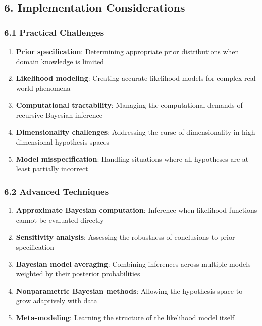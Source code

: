 \documentclass[
]{article}
\providecommand{\tightlist}{%
  \setlength{\itemsep}{0pt}\setlength{\parskip}{0pt}}
\begin{document}
\subsection{6. Implementation
Considerations}\label{implementation-considerations-1}

\subsubsection{6.1 Practical Challenges}\label{practical-challenges-1}

\begin{enumerate}
\def\labelenumi{\arabic{enumi}.}
\tightlist
\item
  \textbf{Prior specification}: Determining appropriate prior
  distributions when domain knowledge is limited
\item
  \textbf{Likelihood modeling}: Creating accurate likelihood models for
  complex real-world phenomena
\item
  \textbf{Computational tractability}: Managing the computational
  demands of recursive Bayesian inference
\item
  \textbf{Dimensionality challenges}: Addressing the curse of
  dimensionality in high-dimensional hypothesis spaces
\item
  \textbf{Model misspecification}: Handling situations where all
  hypotheses are at least partially incorrect
\end{enumerate}

\subsubsection{6.2 Advanced Techniques}\label{advanced-techniques-1}

\begin{enumerate}
\def\labelenumi{\arabic{enumi}.}
\tightlist
\item
  \textbf{Approximate Bayesian computation}: Inference when likelihood
  functions cannot be evaluated directly
\item
  \textbf{Sensitivity analysis}: Assessing the robustness of conclusions
  to prior specification
\item
  \textbf{Bayesian model averaging}: Combining inferences across
  multiple models weighted by their posterior probabilities
\item
  \textbf{Nonparametric Bayesian methods}: Allowing the hypothesis space
  to grow adaptively with data
\item
  \textbf{Meta-modeling}: Learning the structure of the likelihood model
  itself
\end{enumerate}
\end{document}

